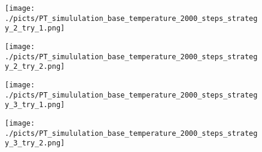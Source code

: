 \begin{frame}[plain]

	\begin{center}
		\begin{figure}\texttt{[image: ./picts/PT\_simululation\_base\_temperature\_2000\_steps\_strategy\_2\_try\_1.png]}\end{figure}	
	\end{center}	
		
\end{frame}

\begin{frame}[plain]

	\begin{center}
		\begin{figure}\texttt{[image: ./picts/PT\_simululation\_base\_temperature\_2000\_steps\_strategy\_2\_try\_2.png]}\end{figure}	
	\end{center}	
		
\end{frame}


\begin{frame}[plain]

	\begin{center}
		\begin{figure}\texttt{[image: ./picts/PT\_simululation\_base\_temperature\_2000\_steps\_strategy\_3\_try\_1.png]}\end{figure}	
	\end{center}	
		
\end{frame}

\begin{frame}[plain]

	\begin{center}
		\begin{figure}\texttt{[image: ./picts/PT\_simululation\_base\_temperature\_2000\_steps\_strategy\_3\_try\_2.png]}\end{figure}	
	\end{center}	
		
\end{frame}
